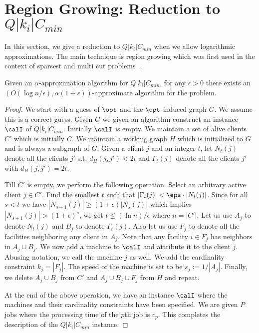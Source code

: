 \section{Region Growing: Reduction to $Q|k_i|C_{min}$}
In this section, we give a reduction to $Q|k_i|C_{min}$ when we allow logarithmic approximations. The main technique is region growing which was first used in the context of sparsest and multi cut problems~\cite{LeightonRao,GVY}.
\begin{theorem}\label{thm:red}
	Given an $\alpha$-approximation algorithm for $Q|k_i|C_{min}$, for any $\epsilon>0$ there exists an \\ $\left(O(\log n/\epsilon), \alpha(1+\epsilon)\right)$-approximate algorithm for the \mckc problem.
	\end{theorem}
\begin{proof}
We start with a guess of $\opt$ and the $\opt$-induced graph $G$. We assume this is a correct guess.
Given $G$ we given an algorithm construct an instance $\calI$ of $Q|k_i|C_{min}$.
Initially $\calI$ is empty. We maintain a set of alive clients $C'$ which is initially $C$. We maintain a working graph $H$ which is initialized to $G$ and is always a subgraph of $G$.
Given a client $j$ and an integer $t$, let $N_t(j)$ denote all the clients $j'$ s.t. $d_H(j,j') < 2t$ and $\Gamma_t(j)$ denote all the clients $j'$ with $d_H(j,j')  = 2t$.\smallskip


Till $C'$ is empty, we perform the following operation.
Select an arbitrary active client $j\in C'$. Find the smallest $t$ such that $|\Gamma_t(j)| < \eps\cdot |N_t(j)|$. Since for all $s < t$ we have $|N_{s+1}(j)|\geq (1+\epsilon)|N_s(j)|$ which implies $|N_{s+1}(j)| > (1+\epsilon)^s$, 
 we get  $t \leq (\ln n)/\epsilon$ where $n=|C'|$. Let us use $A_j$ to denote $N_t(j)$ and $B_j$ to denote $\Gamma_{t}(j)$. Also let us use $F_j$ to denote all the facilities neighboring any client in $A_j$. Note that any facility $i\in F_j$ has neighbors in $A_j \cup B_j$.
We now add a machine to $\calI$ and attribute it to the client $j$. Abusing notation, we call the machine $j$ as well.
We add the  cardinality constraint $k_j = |F_j|$. The speed of the machine is set to be $s_j := 1/|A_j|$.
Finally,  we delete $A_j\cup B_j$ from $C'$ and $A_j\cup B_j\cup F_j$ from $H$ and repeat. \smallskip

At the end of the above operation, we have an instance $\calI$ where the machines and their cardinality constraints have been specified.
We are given $P$ jobs where the processing time of the $p$th job is $c_p$. This completes the description of the $Q|k_i|C_{min}$ instance.


\end{proof}
